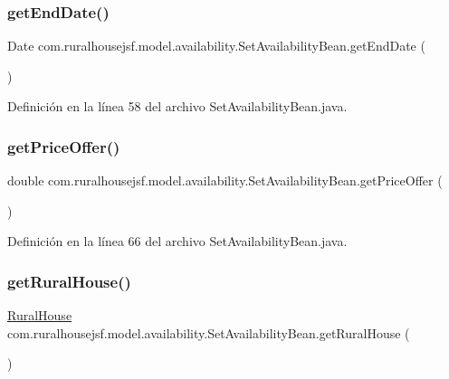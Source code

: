 \subsubsection{\texorpdfstring{getEndDate()}{getEndDate()}}
{\footnotesize\ttfamily Date com.\+ruralhousejsf.\+model.\+availability.\+Set\+Availability\+Bean.\+get\+End\+Date (\begin{DoxyParamCaption}{ }\end{DoxyParamCaption})}



Definición en la línea 58 del archivo Set\+Availability\+Bean.\+java.

\mbox{\label{classcom_1_1ruralhousejsf_1_1model_1_1availability_1_1_set_availability_bean_a264ab7e009d744abc40af63581bbdb05}} 
\subsubsection{\texorpdfstring{getPriceOffer()}{getPriceOffer()}}
{\footnotesize\ttfamily double com.\+ruralhousejsf.\+model.\+availability.\+Set\+Availability\+Bean.\+get\+Price\+Offer (\begin{DoxyParamCaption}{ }\end{DoxyParamCaption})}



Definición en la línea 66 del archivo Set\+Availability\+Bean.\+java.

\mbox{\label{classcom_1_1ruralhousejsf_1_1model_1_1availability_1_1_set_availability_bean_a6fc1e11639074a665cb2413b6e873004}} 
\subsubsection{\texorpdfstring{getRuralHouse()}{getRuralHouse()}}
{\footnotesize\ttfamily \mbox{\hyperlink{classcom_1_1ruralhousejsf_1_1domain_1_1_rural_house}{Rural\+House}} com.\+ruralhousejsf.\+model.\+availability.\+Set\+Availability\+Bean.\+get\+Rural\+House (\begin{DoxyParamCaption}{ }\end{DoxyParamCaption})}



